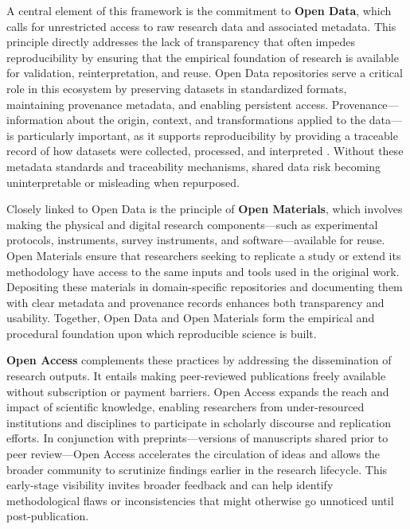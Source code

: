 A central element of this framework is the commitment to \textbf{Open Data}, which calls for unrestricted access to raw research data and associated metadata. This principle directly addresses the lack of transparency that often impedes reproducibility by ensuring that the empirical foundation of research is available for validation, reinterpretation, and reuse. Open Data repositories serve a critical role in this ecosystem by preserving datasets in standardized formats, maintaining provenance metadata, and enabling persistent access. Provenance—information about the origin, context, and transformations applied to the data—is particularly important, as it supports reproducibility by providing a traceable record of how datasets were collected, processed, and interpreted \cite{burgelman_open_2019}. Without these metadata standards and traceability mechanisms, shared data risk becoming uninterpretable or misleading when repurposed.

Closely linked to Open Data is the principle of \textbf{Open Materials}, which involves making the physical and digital research components—such as experimental protocols, instruments, survey instruments, and software—available for reuse. Open Materials ensure that researchers seeking to replicate a study or extend its methodology have access to the same inputs and tools used in the original work. Depositing these materials in domain-specific repositories and documenting them with clear metadata and provenance records enhances both transparency and usability. Together, Open Data and Open Materials form the empirical and procedural foundation upon which reproducible science is built.

\textbf{Open Access} complements these practices by addressing the dissemination of research outputs. It entails making peer-reviewed publications freely available without subscription or payment barriers. Open Access expands the reach and impact of scientific knowledge, enabling researchers from under-resourced institutions and disciplines to participate in scholarly discourse and replication efforts. In conjunction with preprints—versions of manuscripts shared prior to peer review—Open Access accelerates the circulation of ideas and allows the broader community to scrutinize findings earlier in the research lifecycle. This early-stage visibility invites broader feedback and can help identify methodological flaws or inconsistencies that might otherwise go unnoticed until post-publication.

